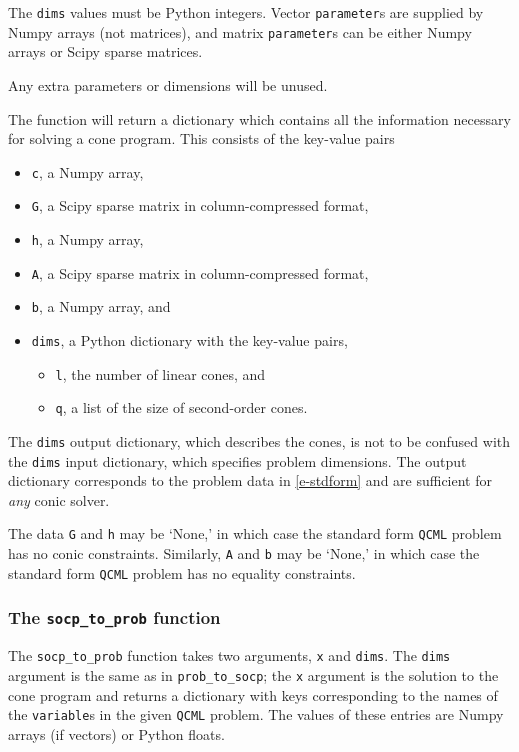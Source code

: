 \documentclass[11pt]{article}
\def\qcml{\texttt{QCML}\xspace}
\begin{document}
The {\tt dims} values must be Python integers. Vector {\tt parameter}s are
supplied by Numpy arrays (not matrices), and matrix {\tt parameter}s can be
either Numpy arrays or Scipy sparse matrices.

Any extra parameters or dimensions will be unused. 

The function will return a dictionary which contains all the information
necessary for solving a cone program. This consists of the key-value pairs
\begin{itemize}
  \item {\tt c}, a Numpy array,
  \item {\tt G}, a Scipy sparse matrix in column-compressed format,
  \item {\tt h}, a Numpy array,
  \item {\tt A}, a Scipy sparse matrix in column-compressed format,
  \item {\tt b}, a Numpy array, and
  \item {\tt dims}, a Python dictionary with the key-value pairs,
  \begin{itemize}
    \item {\tt l}, the number of linear cones, and
    \item {\tt q}, a list of the size of second-order cones.
  \end{itemize}
\end{itemize}
The {\tt dims} output dictionary, which describes the cones, 
is not to be confused with the {\tt dims} input 
dictionary, which specifies problem dimensions. 
The output dictionary corresponds to the problem data in \eqref{e-stdform}
and are sufficient for \emph{any} conic solver.

The data {\tt G} and {\tt h} may be `None,' in which case the standard form
\qcml problem has no conic constraints. Similarly, {\tt A} and {\tt b} may be
`None,' in which case the standard form \qcml problem has no equality
constraints.

\subsubsection{The {\tt socp\_to\_prob} function}
The {\tt socp\_to\_prob} function takes two arguments, {\tt x} and {\tt dims}.
The {\tt dims} argument is the same as in {\tt prob\_to\_socp}; the {\tt x}
argument is
the solution to the cone program and returns a dictionary with keys
corresponding to the names of the {\tt variable}s in the given \qcml problem.
The values of these entries are Numpy arrays (if vectors) or Python floats.
\end{document}
